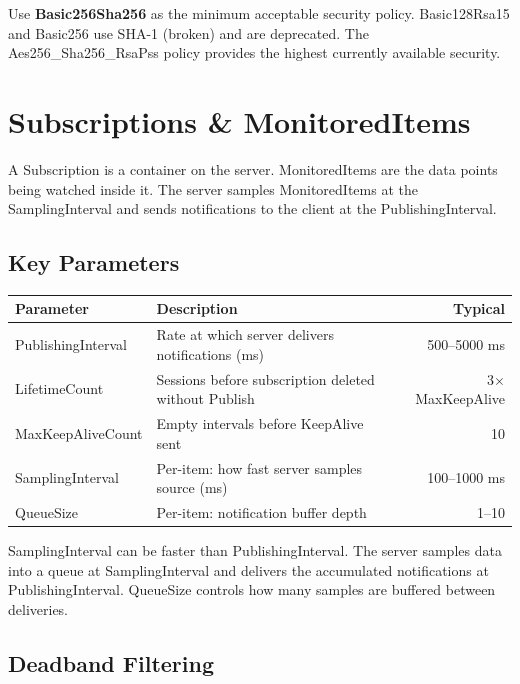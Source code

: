 \documentclass[12pt,twoside,openright]{memoir}
\begin{document}
Use \textbf{Basic256Sha256} as the minimum acceptable security policy. Basic128Rsa15 and Basic256 use SHA-1
(broken) and are deprecated. The Aes256\_Sha256\_RsaPss policy provides the highest currently available security.

\chapter{Subscriptions \& MonitoredItems}

A Subscription is a container on the server. MonitoredItems are the data points being watched inside it.
The server samples MonitoredItems at the SamplingInterval and sends notifications to the client at the
PublishingInterval.

\section{Key Parameters}

\begin{tabularx}{\textwidth}{lXr}
\toprule
\textbf{Parameter} & \textbf{Description} & \textbf{Typical} \\
\midrule
\rowcolor{rowlight} PublishingInterval & Rate at which server delivers notifications (ms) & 500--5000 ms \\
LifetimeCount & Sessions before subscription deleted without Publish & 3$\times$MaxKeepAlive \\
\rowcolor{rowlight} MaxKeepAliveCount & Empty intervals before KeepAlive sent & 10 \\
SamplingInterval & Per-item: how fast server samples source (ms) & 100--1000 ms \\
\rowcolor{rowlight} QueueSize & Per-item: notification buffer depth & 1--10 \\
\bottomrule
\end{tabularx}

\begin{keyconcept}
SamplingInterval can be faster than PublishingInterval. The server samples data into a queue at SamplingInterval
and delivers the accumulated notifications at PublishingInterval. QueueSize controls how many samples are
buffered between deliveries.
\end{keyconcept}

\section{Deadband Filtering}
\end{document}
